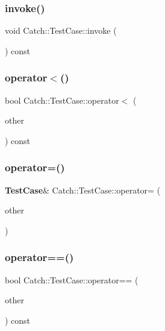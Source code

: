 \mbox{\label{class_catch_1_1_test_case_a26f346c8446dded0562fe3818ae71651}} 
\subsubsection{invoke()}
{\footnotesize\ttfamily void Catch\+::\+Test\+Case\+::invoke (\begin{DoxyParamCaption}{ }\end{DoxyParamCaption}) const}

\mbox{\label{class_catch_1_1_test_case_a030e4b9282e9b32e08c8bd5e5cd6fa98}} 
\subsubsection{operator$<$()}
{\footnotesize\ttfamily bool Catch\+::\+Test\+Case\+::operator$<$ (\begin{DoxyParamCaption}\item[{\textbf{ Test\+Case} const \&}]{other }\end{DoxyParamCaption}) const}

\mbox{\label{class_catch_1_1_test_case_a8022e3f74232f7887d2d2cbbc8876502}} 
\subsubsection{operator=()}
{\footnotesize\ttfamily \textbf{ Test\+Case}\& Catch\+::\+Test\+Case\+::operator= (\begin{DoxyParamCaption}\item[{\textbf{ Test\+Case} const \&}]{other }\end{DoxyParamCaption})}

\mbox{\label{class_catch_1_1_test_case_a5456d03a90f75292835c158f3a3374a1}} 
\subsubsection{operator==()}
{\footnotesize\ttfamily bool Catch\+::\+Test\+Case\+::operator== (\begin{DoxyParamCaption}\item[{\textbf{ Test\+Case} const \&}]{other }\end{DoxyParamCaption}) const}

